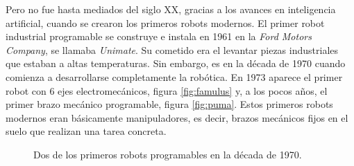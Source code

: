 Pero no fue hasta mediados del siglo XX, gracias a los avances en inteligencia artificial, cuando se crearon los primeros robots modernos. El primer robot industrial programable se construye e instala en 1961 en la \textit{Ford Motors Company}, se llamaba \textit{Unimate}. Su cometido era el levantar piezas industriales que estaban a altas temperaturas. Sin embargo, es en la década de 1970 cuando comienza a desarrollarse completamente la robótica. En 1973 aparece el primer robot con 6 ejes electromecánicos, figura \ref{fig:famulus} y, a los pocos años, el primer brazo mecánico programable, figura \ref{fig:puma}. Estos primeros robots modernos eran básicamente manipuladores, es decir, brazos mecánicos fijos en el suelo que realizan una tarea concreta.\\

\begin{figure}[hbtp]
  \centering
  \caption{Dos de los primeros robots programables en la década de 1970.}
\end{figure}

